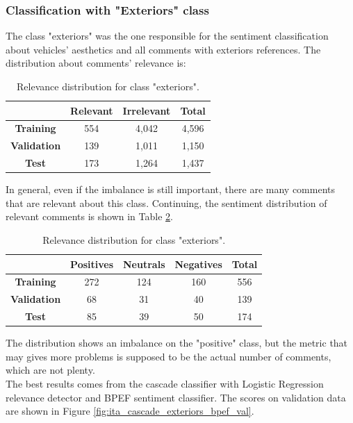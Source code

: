 \subsubsection{Classification with "Exteriors" class}

The class "exteriors" was the one responsible for the sentiment classification about vehicles' aesthetics and all comments with exteriors references. The distribution about comments' relevance is:

\begin{table}[H]
	\centering
	\begin{tabular}{ | c | c  c | c | } 
		\hline
		& \textbf{Relevant} & \textbf{Irrelevant} & \textbf{Total} \\
		\hline
		\textbf{Training} & 554 & 4,042 & 4,596 \\ 
		\hline
		\textbf{Validation} & 139 & 1,011 & 1,150 \\ 
		\hline
		\textbf{Test} & 173 & 1,264 & 1,437 \\
		\hline
	\end{tabular}
	\caption{Relevance distribution for class "exteriors".}
	\label{table:rel-dist-exteriors}
\end{table}

In general, even if the imbalance is still important, there are many comments that are relevant about this class. Continuing, the sentiment distribution of relevant comments is shown in Table \ref{table:snt-dist-exteriors}.

\begin{table}[H]
	\centering
	\begin{tabular}{ | c | c  c c | c | } 
		\hline
		& \textbf{Positives} & \textbf{Neutrals} & \textbf{Negatives} & \textbf{Total} \\
		\hline
		\textbf{Training} & 272 & 124 & 160 & 556 \\ 
		\hline
		\textbf{Validation} & 68 & 31 & 40 & 139 \\ 
		\hline
		\textbf{Test} & 85 & 39 & 50 & 174 \\
		\hline
	\end{tabular}
	\caption{Relevance distribution for class "exteriors".}
	\label{table:snt-dist-exteriors}
\end{table}

The distribution shows an imbalance on the "positive" class, but the metric that may gives more problems is supposed to be the actual number of comments, which are not plenty.\\
The best results comes from the cascade classifier with Logistic Regression relevance detector and BPEF sentiment classifier. The scores on validation data are shown in Figure \ref{fig:ita_cascade_exteriors_bpef_val}.

